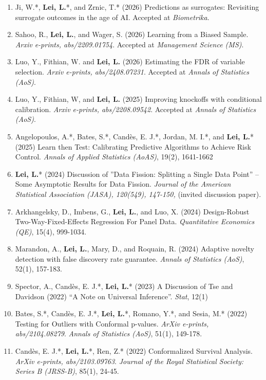 \documentclass{article}
\begin{document}
\begin{enumerate}
\item Ji, W.*, \textbf{Lei, L.}*, and Zrnic, T.* (2026) Predictions as surrogates: Revisiting surrogate outcomes in the age of AI. Accepted at \emph{Biometrika}.
\item Sahoo, R., \textbf{Lei, L.}, and Wager, S. (2026) Learning from a Biased Sample. \emph{Arxiv e-prints, abs/2209.01754}. Accepted at \emph{Management Science (MS)}.  
\item Luo, Y., Fithian, W. and \textbf{Lei, L.} (2026) Estimating the FDR of variable selection. \emph{Arxiv e-prints, abs/2408.07231}. Accepted at \emph{Annals of Statistics (AoS)}.    
\item Luo, Y., Fithian, W, and \textbf{Lei, L.} (2025) Improving knockoffs with conditional calibration. \emph{Arxiv e-prints, abs/2208.09542}. Accepted at \emph{Annals of Statistics (AoS)}.  
\item Angelopoulos, A.*, Bates, S.*, Cand\`{e}s, E. J.*, Jordan, M. I.*, and \textbf{Lei, L.}* (2025) Learn then Test: Calibrating Predictive Algorithms to Achieve Risk Control. \emph{Annals of Applied Statistics (AoAS)}, 19(2), 1641-1662
\item \textbf{Lei, L.}* (2024) Discussion of ”Data Fission: Splitting a Single Data Point” – Some Asymptotic Results for Data Fission. \emph{Journal of the American Statistical Association (JASA), 120(549), 147-150,} (invited discussion paper).
\item Arkhangelsky, D., Imbens, G., \textbf{Lei, L.}, and Luo, X. (2024) Design-Robust Two-Way-Fixed-Effects Regression For Panel Data. \emph{Quantitative Economics (QE)}, 15(4), 999-1034.
\item Marandon, A., \textbf{Lei, L.}, Mary, D., and Roquain, R. (2024) Adaptive novelty detection with false discovery rate guarantee. \emph{Annals of Statistics (AoS)}, 52(1), 157-183.
\item Spector, A., Cand\`{e}s, E. J.*, \textbf{Lei, L.}* (2023) A Discussion of Tse and Davidson (2022) “A Note on Universal Inference”. \emph{Stat}, 12(1)
\item Bates, S.*, Cand\`{e}s, E. J.*, \textbf{Lei, L.}*, Romano, Y.*, and Sesia, M.* (2022) Testing for Outliers with Conformal p-values. \emph{ArXiv e-prints, abs/2104.08279}. \emph{Annals of Statistics (AoS)}, 51(1), 149-178.  
\item Cand\`{e}s, E. J.*, \textbf{Lei, L.}*, Ren, Z.* (2022) Conformalized Survival Analysis. \emph{ArXiv e-prints, abs/2103.09763}. \emph{Journal of the Royal Statistical Society: Series B (JRSS-B)}, 85(1), 24-45.

\end{enumerate}
\end{document}
